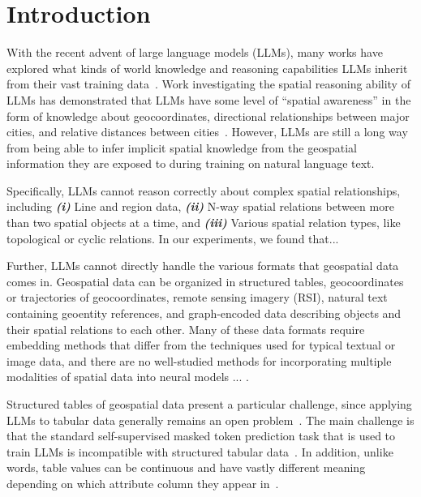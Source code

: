 \section{Introduction}

\label{section:introduction}

With the recent advent of large language models (LLMs), many works have explored what kinds of world knowledge and reasoning capabilities LLMs inherit from their vast training data~\cite{Mai2023, Bhandari2023, Qi2023}.
%
%
Work investigating the spatial reasoning ability of LLMs has demonstrated that LLMs have some level of ``spatial awareness'' in the form of knowledge about geocoordinates, directional relationships between major cities, and relative distances between cities~\cite{Bhandari2023, Qi2023}.
However, LLMs are still a long way from being able to infer implicit spatial knowledge from the geospatial information they are exposed to during training on natural language text.


Specifically, LLMs cannot reason correctly about complex spatial relationships, including
%
\textit{\textbf{(i)}} Line and region data,
\textit{\textbf{(ii)}} N-way spatial relations between more than two spatial objects at a time, and 
\textit{\textbf{(iii)}} Various spatial relation types, like topological or cyclic relations.
%
In our experiments, we found that... 


Further, LLMs cannot directly handle the various formats that geospatial data comes in.
Geospatial data can be organized in structured tables, geocoordinates or trajectories of geocoordinates, remote sensing imagery (RSI), natural text containing geoentity references, and graph-encoded data describing objects and their spatial relations to each other.
%
Many of these data formats require embedding methods that differ from the techniques used for typical textual or image data, and there are no well-studied methods for incorporating multiple modalities of spatial data into neural models ...  \cite{Trappolini2023}.


Structured tables of geospatial data present a particular challenge, since applying LLMs to tabular data generally remains an open problem~\cite{Gao2023,Cong2023}.
The main challenge is that the standard self-supervised masked token prediction task that is used to train LLMs is incompatible with structured tabular data~\cite{Tan2023, Qi2023}.
In addition, unlike words, table values can be continuous and have vastly different meaning depending on which attribute column they appear in~\cite{Qi2023}.


